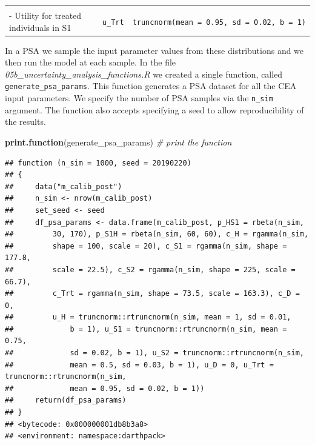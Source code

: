 \documentclass[]{book}
\newenvironment{Shaded}{\begin{snugshade}}{\end{snugshade}}
\newcommand{\CommentTok}[1]{\textcolor[rgb]{0.56,0.35,0.01}{\textit{#1}}}
\newcommand{\KeywordTok}[1]{\textcolor[rgb]{0.13,0.29,0.53}{\textbf{#1}}}
\newcommand{\NormalTok}[1]{#1}
\begin{document}
\begin{longtable}[]{@{}lll@{}}
\begin{minipage}[t]{0.33\columnwidth}
\end{minipage} & \begin{minipage}[t]{0.13\columnwidth}\raggedright
\strut
\end{minipage} & \begin{minipage}[t]{0.46\columnwidth}\raggedright
\strut
\end{minipage}\tabularnewline
\begin{minipage}[t]{0.33\columnwidth}\raggedright
- Utility for treated individuals in S1\strut
\end{minipage} & \begin{minipage}[t]{0.13\columnwidth}\raggedright
\texttt{u\_Trt}\strut
\end{minipage} & \begin{minipage}[t]{0.46\columnwidth}\raggedright
\texttt{truncnorm(mean\ =\ 0.95,\ sd\ =\ 0.02,\ b\ =\ 1)}\strut
\end{minipage}\tabularnewline
\bottomrule
\end{longtable}

In a PSA we sample the input parameter values from these distributions and we then run the model at each sample. In the file \emph{05b\_uncertainty\_analysis\_functions.R} we created a single function, called \texttt{generate\_psa\_params}. This function generates a PSA dataset for all the CEA input parameters. We specify the number of PSA samples via the \texttt{n\_sim} argument. The function also accepts specifying a seed to allow reproducibility of the results.

\begin{Shaded}
\begin{Highlighting}[]
\KeywordTok{print.function}\NormalTok{(generate_psa_params) }\CommentTok{# print the function }
\end{Highlighting}
\end{Shaded}

\begin{verbatim}
## function (n_sim = 1000, seed = 20190220) 
## {
##     data("m_calib_post")
##     n_sim <- nrow(m_calib_post)
##     set_seed <- seed
##     df_psa_params <- data.frame(m_calib_post, p_HS1 = rbeta(n_sim, 
##         30, 170), p_S1H = rbeta(n_sim, 60, 60), c_H = rgamma(n_sim, 
##         shape = 100, scale = 20), c_S1 = rgamma(n_sim, shape = 177.8, 
##         scale = 22.5), c_S2 = rgamma(n_sim, shape = 225, scale = 66.7), 
##         c_Trt = rgamma(n_sim, shape = 73.5, scale = 163.3), c_D = 0, 
##         u_H = truncnorm::rtruncnorm(n_sim, mean = 1, sd = 0.01, 
##             b = 1), u_S1 = truncnorm::rtruncnorm(n_sim, mean = 0.75, 
##             sd = 0.02, b = 1), u_S2 = truncnorm::rtruncnorm(n_sim, 
##             mean = 0.5, sd = 0.03, b = 1), u_D = 0, u_Trt = truncnorm::rtruncnorm(n_sim, 
##             mean = 0.95, sd = 0.02, b = 1))
##     return(df_psa_params)
## }
## <bytecode: 0x000000001db8b3a8>
## <environment: namespace:darthpack>
\end{verbatim}
\end{document}

